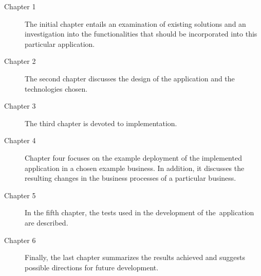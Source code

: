 \begin{description}
\item[Chapter 1] The initial chapter entails an examination of existing solutions and an investigation into the functionalities that should be incorporated into this particular application.

\item[Chapter 2] The second chapter discusses the design of the application and the technologies chosen.

\item[Chapter 3] The third chapter is devoted to implementation.

\item[Chapter 4] Chapter four focuses on the example deployment of the implemented application in a chosen example business. In addition, it discusses the resulting changes in the business processes of a particular business.

\item[Chapter 5] In the fifth chapter, the tests used in the development of the~application are described.

\item[Chapter 6] Finally, the last chapter summarizes the results achieved and suggests possible directions for future development.
\end{description}